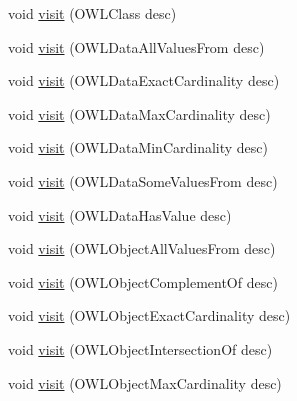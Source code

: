 \begin{DoxyCompactItemize}
\item 
void \hyperlink{classorg_1_1coode_1_1owlapi_1_1functionalrenderer_1_1_o_w_l_object_renderer_aab108d8567d2e38fa7699f7ad7603dc0}{visit} (O\-W\-L\-Class desc)
\item 
void \hyperlink{classorg_1_1coode_1_1owlapi_1_1functionalrenderer_1_1_o_w_l_object_renderer_a7d071dc715b96f57865e3abf9b34a9f2}{visit} (O\-W\-L\-Data\-All\-Values\-From desc)
\item 
void \hyperlink{classorg_1_1coode_1_1owlapi_1_1functionalrenderer_1_1_o_w_l_object_renderer_a49c439160335320f116d34c278550d2d}{visit} (O\-W\-L\-Data\-Exact\-Cardinality desc)
\item 
void \hyperlink{classorg_1_1coode_1_1owlapi_1_1functionalrenderer_1_1_o_w_l_object_renderer_af0fe667912667d16b5322c4f2a706512}{visit} (O\-W\-L\-Data\-Max\-Cardinality desc)
\item 
void \hyperlink{classorg_1_1coode_1_1owlapi_1_1functionalrenderer_1_1_o_w_l_object_renderer_a317fd6a899446c90b533ae3a266b2e2b}{visit} (O\-W\-L\-Data\-Min\-Cardinality desc)
\item 
void \hyperlink{classorg_1_1coode_1_1owlapi_1_1functionalrenderer_1_1_o_w_l_object_renderer_a0bdeaac6b6c744bce4a9a336a6be8892}{visit} (O\-W\-L\-Data\-Some\-Values\-From desc)
\item 
void \hyperlink{classorg_1_1coode_1_1owlapi_1_1functionalrenderer_1_1_o_w_l_object_renderer_afad7b845a656ecfc7b526601a04ed663}{visit} (O\-W\-L\-Data\-Has\-Value desc)
\item 
void \hyperlink{classorg_1_1coode_1_1owlapi_1_1functionalrenderer_1_1_o_w_l_object_renderer_a6da5e09b6b93447a1ee83e218b7564b2}{visit} (O\-W\-L\-Object\-All\-Values\-From desc)
\item 
void \hyperlink{classorg_1_1coode_1_1owlapi_1_1functionalrenderer_1_1_o_w_l_object_renderer_a9429911c0c16866504ca874b64a061ff}{visit} (O\-W\-L\-Object\-Complement\-Of desc)
\item 
void \hyperlink{classorg_1_1coode_1_1owlapi_1_1functionalrenderer_1_1_o_w_l_object_renderer_a5ece238805d2a282b87abdd7ae6c0cd3}{visit} (O\-W\-L\-Object\-Exact\-Cardinality desc)
\item 
void \hyperlink{classorg_1_1coode_1_1owlapi_1_1functionalrenderer_1_1_o_w_l_object_renderer_af7f50bcc46c88537d3943d05727bda65}{visit} (O\-W\-L\-Object\-Intersection\-Of desc)
\item 
void \hyperlink{classorg_1_1coode_1_1owlapi_1_1functionalrenderer_1_1_o_w_l_object_renderer_a9c9fd6db61822a6a9f91ed0fb2bb32cd}{visit} (O\-W\-L\-Object\-Max\-Cardinality desc)

\end{DoxyCompactItemize}
